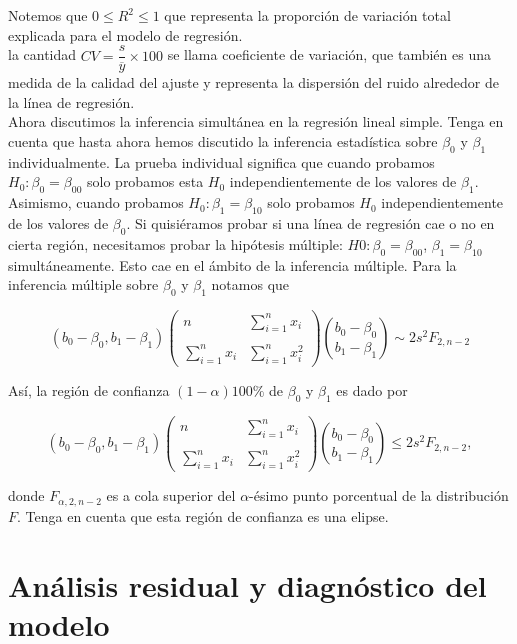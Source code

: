 Notemos que $0\leq R^2\leq 1$ que representa la proporción de variación total  explicada para el modelo de regresión.\\
la cantidad $CV=\dfrac{s}{\overline{y}}\times 100$ se llama coeficiente de variación, que también es una medida de la calidad del ajuste y representa la dispersión del ruido alrededor de la línea de regresión. \\

Ahora discutimos la inferencia simultánea en la regresión lineal simple. Tenga en cuenta que hasta ahora hemos discutido la inferencia estadística sobre $\beta_0$ y $\beta_1$ individualmente. La prueba individual significa que cuando probamos $H_0: \beta_0 = \beta_{00}$ solo probamos esta $H_0$ independientemente de los valores de $\beta_1$. Asimismo, cuando probamos $H_0: \beta_1 = \beta_{10}$ solo probamos $H_0$ independientemente de los valores de $\beta_0$. Si quisiéramos probar si una línea de regresión cae o no en cierta región, necesitamos probar la hipótesis múltiple: $H0: \beta_0 = \beta_{00}$, $\beta_1 = \beta_{10}$ simultáneamente. Esto cae en el ámbito de la inferencia múltiple. Para la inferencia múltiple sobre $\beta_0$ y $\beta_1$ notamos que

$$
\left(b_0-\beta_0,b_1-\beta_1\right)
\left(
    \begin{array}{cc}
	n & \displaystyle\sum_{i=1}^n x_i\\\\
	\displaystyle\sum_{i=1}^n x_i & \displaystyle\sum_{i=1}^n x_i^2
    \end{array}
\right)
{b_0-\beta_0\choose b_1-\beta_1}
\sim 2s^2F_{2,n-2}
$$

Así, la región de confianza $(1-\alpha)100\%$ de $\beta_0$ y $\beta_1$ es dado por

$$
\left(b_0-\beta_0,b_1-\beta_1\right)
\left(
    \begin{array}{cc}
	n & \displaystyle\sum_{i=1}^n x_i\\\\
	\displaystyle\sum_{i=1}^n x_i & \displaystyle\sum_{i=1}^n x_i^2
    \end{array}
\right)
{b_0-\beta_0\choose b_1-\beta_1}
\leq 2s^2F_{2,n-2},
$$

donde $F_{\alpha,2,n-2}$ es a cola superior del $\alpha$-ésimo punto porcentual de la distribución $F$. Tenga en cuenta que esta región de confianza es una elipse.


\section{Análisis residual y diagnóstico del modelo}
